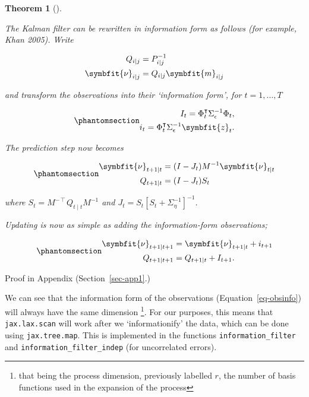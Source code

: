 \documentclass[
]{report}
\newcommand{\bv}[1]{\symbfit{#1}}
\theoremstyle{plain}
\theoremstyle{plain}
\newtheorem{theorem}{Theorem}[section]
\theoremstyle{remark}
\begin{document}
\begin{theorem}[]\protect\hypertarget{thm-information_filter}{}\label{thm-information_filter}

The Kalman filter can be rewritten in information form as follows (for
example, Khan 2005). Write

\[\begin{split}
Q_{i\mid j} &= P_{i\mid j}^{-1}\\
\bv\nu_{i\mid j} &= Q_{i\mid j} \bv m_{i\mid j}
\end{split}
\]

and transform the observations into their `information form', for
\(t=1,\dots, T\)

\begin{equation}\phantomsection\label{eq-obsinfo}{\begin{split}
I_{t} = \Phi_{t}^{\intercal} \Sigma_{\epsilon}^{-1}\Phi_{t},\\
i_{t} = \Phi_{t}^{\intercal} \Sigma_{\epsilon}^{-1} \bv z_{t}.
\end{split}
}\end{equation}

The prediction step now becomes

\begin{equation}\phantomsection\label{eq-infpred}{\begin{split}
\bv\nu_{t+1\mid t} &= (I-J_t) M^{-1}\bv\nu_{t\mid t}\\
Q_{t+1\mid t} &= (I-J_t) S_{t} 
\end{split}
}\end{equation}

where \(S_t = M^{-\intercal} Q_{t\mid t} M^{-1}\) and
\(J_t = S_t [S_{t}+\Sigma_{\eta}^{-1}]^{-1}\).

Updating is now as simple as adding the information-form observations;

\begin{equation}\phantomsection\label{eq-infupd}{\begin{split}
  \bv\nu_{t+1\mid t+1} &= \bv\nu_{t+1\mid t} + i_{t+1}\\
  Q_{t+1\mid t+1} &= Q_{t+1\mid t} + I_{t+1}.
\end{split}
}\end{equation}

\end{theorem}

Proof in Appendix (Section~\ref{sec-app1}.)

We can see that the information form of the observations
(Equation~\ref{eq-obsinfo}) will always have the same dimension
\footnote{that being the process dimension, previously labelled \(r\),
  the number of basis functions used in the expansion of the process}.
For our purposes, this means that \texttt{jax.lax.scan} will work after
we `informationify' the data, which can be done using
\texttt{jax.tree.map}. This is implemented in the functions
\texttt{information\_filter} and \texttt{information\_filter\_indep}
(for uncorrelated errors).
\end{document}
